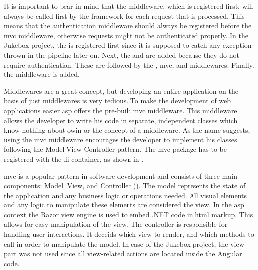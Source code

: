 It is important to bear in mind that the middleware, which is registered first, will always be called first by the framework for each request that is processed. This means that the authentication middleware should always be registered before the \gls{mvc} middleware, otherwise requests might not be authenticated properly. In the Jukebox project, the  is registered first since it is supposed to catch any exception thrown in the pipeline later on. Next, the  and  are added because they do not require authentication. These are followed by the , \gls{mvc}, and  middlewares. Finally, the  middleware is added.




Middlewares are a great concept, but developing an entire application on the basis of just middlewares is very tedious. To make the development of web applications easier \gls{asp} offers the pre-built \gls{mvc} middleware. This middleware allows the developer to write his code in separate, independent classes which know nothing about \gls{owin} or the concept of a middleware. As the name suggests, using the \gls{mvc} middleware encourages the developer to implement his classes following the Model-View-Controller pattern. The \gls{mvc} package has to be registered with the \gls{di} container, as shown in .

\gls{mvc} is a popular pattern in software development and consists of three main components: Model, View, and Controller (). The model represents the state of the application and any business logic or operations needed. All visual elements and any logic to manipulate these elements are considered the view. In the \gls{asp} context the Razor view engine is used to embed .NET code in \gls{html} markup. This allows for easy manipulation of the view. The controller is responsible for handling user interactions. It deceids which view to render, and which methods to call in order to manipulate the model. In case of the Jukebox project, the view part was not used since all view-related actions are located inside the Angular code. \cite{mvcOverview}


